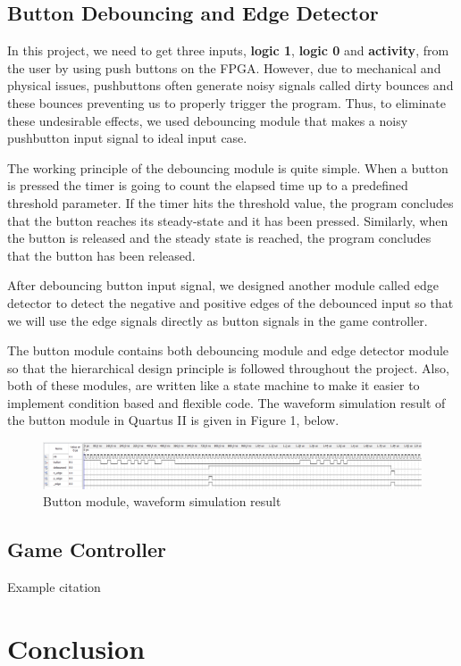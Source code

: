 \documentclass[conference]{IEEEtran}
\begin{document}
\subsection{Button Debouncing and Edge Detector}
In this project, we need to get three inputs, \textbf{logic 1}, \textbf{logic 0} and \textbf{activity}, from the user by using push buttons on the FPGA. However, due to mechanical and physical issues, pushbuttons often generate noisy signals called dirty bounces and these bounces preventing us to properly trigger the program. Thus, to eliminate these undesirable effects, we used debouncing module that makes a noisy pushbutton input signal to ideal input case. \\
\par The working principle of the debouncing module is quite simple. When a button is pressed the timer is going to count the elapsed time up to a predefined threshold parameter. If the timer hits the threshold value, the program concludes that the button reaches its steady-state and it has been pressed. Similarly, when the button is released and the steady state is reached, the program concludes that the button has been released. \\
\par After debouncing button input signal, we designed another module called edge detector to detect the negative and positive edges of the debounced input so that we will use the edge signals directly as button signals in the game controller. \\
\par The button module contains both debouncing module and edge detector module so that the hierarchical design principle is followed throughout the project. Also, both of these modules, are written like a state machine to make it easier to implement condition based and flexible code. The waveform simulation result of the button module in Quartus II is given in Figure 1, below. 
 \begin{figure}[H]
   \centerline{\includegraphics[scale=0.22]{simulation.png}}
    \caption{Button module, waveform simulation result}
\end{figure} 
\subsection{Game Controller}

Example citation \cite{butterworth}
\section{Conclusion}



\end{document}
